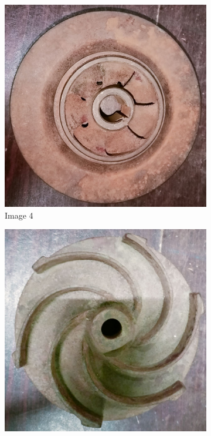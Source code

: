 \documentclass[12pt]{article}
\begin{document}
\begin{figure}[h]
    \begin{subfigure}{0.3\textwidth}
        \includegraphics[width=\linewidth]{img/p_04.jpg}
        \caption{Image 4}
    \end{subfigure}
    \hfill
    \begin{subfigure}{0.3\textwidth}
        \includegraphics[width=\linewidth]{img/p_05.jpg}

\end{subfigure}
\end{figure}
\end{document}
